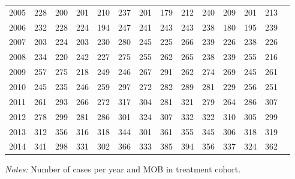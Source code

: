 \begin{table}[H]
\begin{threeparttable}
{\begin{tabular}{l*{13}{c}}
2005        &         228&         200&         201&         210&         237&         201&         179&         212&         240&         209&         201&         213\\
2006        &         232&         228&         224&         194&         247&         241&         243&         243&         238&         180&         195&         239\\
2007        &         203&         224&         203&         230&         280&         245&         225&         266&         239&         226&         238&         226\\
2008        &         234&         220&         242&         227&         275&         255&         262&         265&         238&         239&         255&         216\\
2009        &         257&         275&         218&         249&         246&         267&         291&         262&         274&         269&         245&         261\\
2010        &         245&         235&         246&         259&         297&         272&         282&         289&         281&         229&         256&         251\\
2011        &         261&         293&         266&         272&         317&         304&         281&         321&         279&         264&         286&         307\\
2012        &         278&         299&         281&         286&         301&         324&         307&         332&         322&         310&         305&         299\\
2013        &         312&         356&         316&         318&         344&         301&         361&         355&         345&         306&         318&         319\\
2014        &         341&         298&         331&         302&         366&         333&         385&         394&         356&         337&         324&         362\\
 \bottomrule \end{tabular} } \begin{tablenotes} \item \scriptsize \emph{Notes:} Number of cases per year and MOB in treatment cohort. \end{tablenotes} \end{threeparttable} \end{table} 
